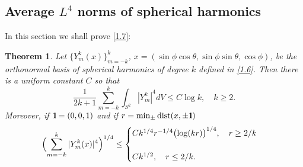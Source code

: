 \documentclass[10pt]{amsart}
\newtheorem{theorem}{Theorem}
\begin{document}
{\subsection{{Average $L^4$ norms of spherical harmonics}}\setcounter{theorem}{0} \setcounter{equation}{0}
\par\noindent}

In this section we shall prove \eqref{1.7}:

\begin{theorem}\label{theorem2}  Let $\{Y^k_m(x)\}_{m=-k}^k$,
$x=(\sin\phi \cos\theta, \sin \phi \sin\theta, \cos\phi)$, be the
orthonormal
basis of spherical harmonics of degree $k$ defined in \eqref{1.6}.  Then  there is a uniform constant $C$
so that
\begin{equation}\label{3.1}
\frac1{2k+1}\sum_{m=-k}^k\int_{S^2}|Y^k_m|^4dV  \le C\log k, \quad
k\ge2.
\end{equation}
Moreover, if ${{\rm 1\hspace*{-0.4ex}\rule{0.1ex}{1.52ex}\hspace*{0.2ex}}}=(0,0,1)$ and if $r=\min_\pm \text{dist}(x,\pm{{\rm 1\hspace*{-0.4ex}\rule{0.1ex}{1.52ex}\hspace*{0.2ex}}})$
\begin{equation}\label{3.2}
\Bigl(\sum_{m=-k}^k |Y^k_m(x)|^4\Bigr)^{1/4} \le \begin{cases}
Ck^{1/4} r^{-1/4}\bigl(\log (kr)\bigr)^{1/4}, \quad r\ge 2/k
\\ \\
Ck^{1/2}, \quad r\le 2/k.
\end{cases}
\end{equation}
\end{theorem}
\end{document}

